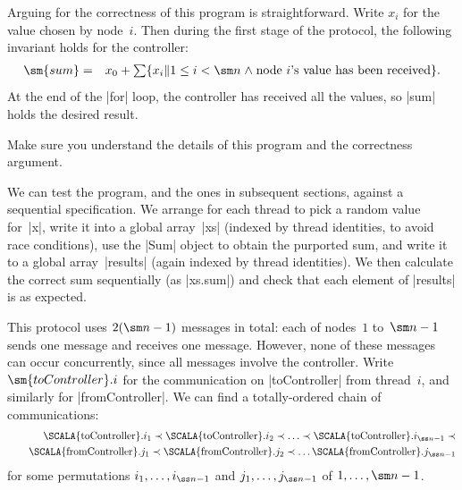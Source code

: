 
Arguing for the correctness of this program is straightforward.
Write $x_i$ for the value chosen by node~$i$.  Then during the first stage of
the protocol, the following invariant holds for the controller:
%
\begin{eqnarray*}
\sm{sum} & = & 
   x_0 + \textstyle\sum \set{x_i \| 1 \le i < \sm n \land 
           \mbox{node~$i$'s value has been received}}.
\end{eqnarray*}
%
At the end of the |for| loop, the controller has received all the values, so
|sum| holds the desired result. 

\begin{instruction}
Make sure you understand the details of this program and the correctness
argument.
\end{instruction}


We can test the program, and the ones in subsequent sections, against
a sequential specification.  We arrange for each thread to pick a random value
for~|x|, write it into a global array~|xs| (indexed by thread identities, to
avoid race conditions), use the |Sum| object to obtain the purported sum, and
write it to a global array~|results| (again indexed by thread identities).  We
then calculate the correct sum sequentially (as |xs.sum|) and check that each
element of |results| is as expected.


This protocol uses $2(\sm n-1)$ messages in total: each of nodes~$1$ to~$\sm
n-1$ sends one message and receives one message.  However, none of these
messages can occur concurrently, since all messages involve the controller.
Write $\sm{toController}.i$ for the communication on |toController| from
thread~$i$, and similarly for |fromController|.  We can find a totally-ordered
chain of communications:
\[
\begin{align}
\mbox{\SCALA{toController}}.i_1 \prec \mbox{\SCALA{toController}}.i_2 
  \prec \ldots  \prec \mbox{\SCALA{toController}}.i_{\ss n-1} \prec \\
\qquad
  \mbox{\SCALA{fromController}}.j_1 \prec \mbox{\SCALA{fromController}}.j_2 
  \prec \ldots \mbox{\SCALA{fromController}}.j_{\ss n-1}
\end{align}
\]
for some permutations $i_1, \ldots, i_{\ss n-1}$ and $j_1, \ldots, j_{\ss
  n-1}$ of $1, \ldots, \sm n-1$.



